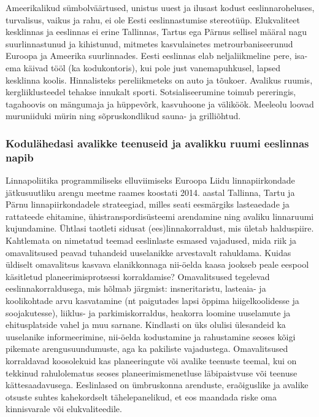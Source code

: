 \documentclass[estonian,]{article}
\begin{document}
Ameerikalikud sümbolväärtused, unistus uuest ja ilusast kodust eeslinnaroheluses, turvalisus, vaikus ja rahu, ei ole Eesti eeslinnastumise stereotüüp. Elukvaliteet kesklinnas ja eeslinnas ei erine Tallinnas, Tartus ega Pärnus sellisel määral nagu suurlinnastunud ja kihistunud, mitmetes kasvulainetes metrourbaniseerunud Euroopa ja Ameerika suurlinnades. Eesti eeslinnas elab neljaliikmeline pere, isa-ema käivad tööl (ka kodukontoris), kui pole just vanemapuhkusel, lapsed kesklinna koolis. Hinnalisteks pereliikmeteks on auto ja tõukoer. Avalikus ruumis, kergliiklusteedel tehakse innukalt sporti. Sotsialiseerumine toimub pereringis, tagahoovis on mängumaja ja hüppevõrk, kasvuhoone ja väliköök. Meeleolu loovad muruniiduki mürin ning sõpruskondlikud sauna- ja grilliõhtud.

\hypertarget{koduluxe4hedasi-avalikke-teenuseid-ja-avalikku-ruumi-eeslinnas-napib}{%
\subsubsection*{Kodulähedasi avalikke teenuseid ja avalikku ruumi eeslinnas napib}\label{koduluxe4hedasi-avalikke-teenuseid-ja-avalikku-ruumi-eeslinnas-napib}}

Linnapoliitika programmiliseks elluviimiseks Euroopa Liidu linnapiirkondade jätkusuutliku arengu meetme raames koostati 2014. aastal Tallinna, Tartu ja Pärnu linnapiirkondadele strateegiad, milles seati eesmärgiks lasteaedade ja rattateede ehitamine, ühistranspordisüsteemi arendamine ning avaliku linnaruumi kujundamine. Ühtlasi taotleti sidusat (ees)linnakorraldust, mis ületab halduspiire. Kahtlemata on nimetatud teemad eeslinlaste esmased vajadused, mida riik ja omavalitsused peavad tuhandeid uuselanikke arvestavalt rahuldama. Kuidas üldiselt omavalitsus kasvava elanikkonnaga nii-öelda kaasa jookseb peale eespool käsitletud planeerimisprotsessi korraldamise? Omavalitsused tegelevad eeslinnakorraldusega, mis hõlmab järgmist: insneritaristu, lasteaia- ja koolikohtade arvu kasvatamine (nt paigutades lapsi õppima hiigelkoolidesse ja soojakutesse), liiklus- ja parkimiskorraldus, heakorra loomine uuselamute ja ehitusplatside vahel ja muu sarnane. Kindlasti on üks olulisi ülesandeid ka uuselanike informeerimine, nii-öelda kodustamine ja rahustamine seoses kõigi pikemate arengusuundumuste, aga ka pakiliste vajadustega. Omavalitsused korraldavad koosolekuid kas planeeringute või avalike teenuste teemal, kui on tekkinud rahulolematus seoses planeerimismenetluse läbipaistvuse või teenuse kättesaadavusega. Eeslinlased on ümbruskonna arenduste, eraõiguslike ja avalike otsuste suhtes kahekordselt tähelepanelikud, et eos maandada riske oma kinnisvarale või elukvaliteedile.
\end{document}
